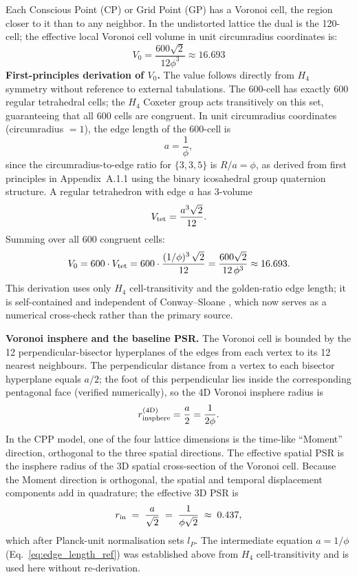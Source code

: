 \documentclass[11pt,letterpaper]{article}
\begin{document}
Each Conscious Point (CP) or Grid Point (GP) has a Voronoi cell, the region closer to it than to any neighbor. In the undistorted lattice the dual is the 120-cell; the effective local Voronoi cell volume in unit circumradius coordinates is:
\begin{equation}
V_0 = \frac{600\sqrt{2}}{12\phi^3} \approx 16.693
\label{eq:v0}
\end{equation}
\textbf{First-principles derivation of $V_0$.}
The value follows directly from $H_4$ symmetry without reference to 
external tabulations.
The 600-cell has exactly 600 regular tetrahedral cells; the $H_4$ 
Coxeter group acts transitively on this set, guaranteeing that all 
600 cells are congruent.
In unit circumradius coordinates (circumradius $= 1$), the edge length of the 600-cell is
\begin{equation}
  a = \frac{1}{\phi},
  \label{eq:edge_length_ref}
\end{equation}
since the circumradius-to-edge ratio for $\{3,3,5\}$ is $R/a = \phi$, 
as derived from first principles in Appendix~A.1.1 using the binary 
icosahedral group quaternion structure.
A regular tetrahedron with edge $a$ has 3-volume
\[
  V_{\rm tet} = \frac{a^3\sqrt{2}}{12}.
\]
Summing over all 600 congruent cells:
\begin{equation}
  V_0 = 600 \cdot V_{\rm tet}
      = 600 \cdot \frac{(1/\phi)^3\,\sqrt{2}}{12}
      = \frac{600\sqrt{2}}{12\,\phi^3}
      \approx 16.693.
  \label{eq:v0_derived}
\end{equation}
This derivation uses only $H_4$ cell-transitivity and the 
golden-ratio edge length; it is self-contained and independent of 
Conway--Sloane \cite{conway1988}, which now serves as a numerical 
cross-check rather than the primary source.

\textbf{Voronoi insphere and the baseline PSR.}
The Voronoi cell is bounded by the 12 perpendicular-bisector hyperplanes
of the edges from each vertex to its 12 nearest neighbours.
The perpendicular distance from a vertex to each bisector hyperplane
equals $a/2$; the foot of this perpendicular lies inside the
corresponding pentagonal face (verified numerically), so the
4D Voronoi insphere radius is
\begin{equation}
  r_{\rm insphere}^{\rm (4D)} = \frac{a}{2} = \frac{1}{2\phi}.
  \label{eq:voronoi_insphere}
\end{equation}
In the CPP model, one of the four lattice dimensions is the
time-like ``Moment'' direction, orthogonal to the three spatial
directions. The effective spatial PSR is the insphere radius
of the 3D spatial cross-section of the Voronoi cell. Because the
Moment direction is orthogonal, the spatial and temporal displacement
components add in quadrature; the effective 3D PSR is
\begin{equation}
  r_{\rm in} \;=\; \frac{a}{\sqrt{2}}
           \;=\; \frac{1}{\phi\sqrt{2}} \;\approx\; 0.437,
  \label{eq:r_in_derived}
\end{equation}
which after Planck-unit normalisation sets $l_P$. The intermediate
equation $a = 1/\phi$ (Eq.~\ref{eq:edge_length_ref}) was established
above from $H_4$ cell-transitivity and is used here without
re-derivation.
\end{document}

